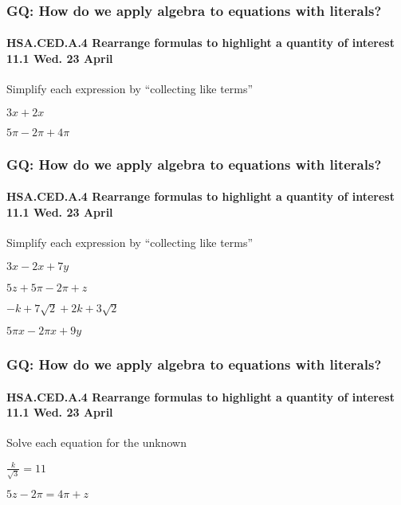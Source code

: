 \documentclass{beamer}
\begin{document}
\frame
{
  \frametitle{GQ: How do we apply algebra to equations with literals?}
  \framesubtitle{HSA.CED.A.4 Rearrange formulas to highlight a quantity of interest \hfill \alert{11.1 Wed. 23 April}}

  \Large{
  Simplify each expression by ``collecting like terms''
  
  \begin{enumerate}
    \begin{multicols}{2}
      \item $3x+2x$ \vspace{2cm}
      \item $5\pi-2\pi+4\pi$
    \end{multicols}
    \end{enumerate} \vspace{5cm}
}
}

\frame
{
  \frametitle{GQ: How do we apply algebra to equations with literals?}
  \framesubtitle{HSA.CED.A.4 Rearrange formulas to highlight a quantity of interest \hfill \alert{11.1 Wed. 23 April}}

  Simplify each expression by ``collecting like terms''
\Large{  
  \begin{enumerate}%
    \begin{multicols}{2}
      \item $3x-2x+7y$ \vspace{2cm}
      \item $5z+5\pi-2\pi+z$
      \item $-k+7\sqrt{2}+2k+3\sqrt{2}$ \vspace{2cm}
      \item $5\pi x-2 \pi x +9y$
    \end{multicols}
    \end{enumerate} \vspace{2cm}
}}


\frame
{
  \frametitle{GQ: How do we apply algebra to equations with literals?}
  \framesubtitle{HSA.CED.A.4 Rearrange formulas to highlight a quantity of interest \hfill \alert{11.1 Wed. 23 April}}
  \Large{
  Solve each equation for the unknown
  
  \begin{enumerate}
    \begin{multicols}{2}
      \item $\displaystyle \frac{k}{\sqrt{3}}=11$
      \item $5z-2 \pi = 4\pi +z$
    \end{multicols}
    \end{enumerate} \vspace{7cm}
}}
\end{document}
